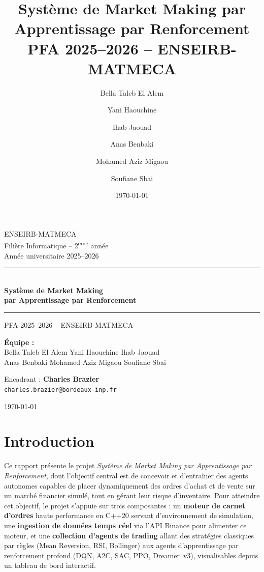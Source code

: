 \documentclass[11pt,a4paper]{article}
\title{
    \vspace{-1cm}
    \Huge \textbf{Système de Market Making par Apprentissage par Renforcement} \\[0.5cm]
    \large PFA 2025--2026 -- ENSEIRB-MATMECA
}
\author{
    Bella Taleb El Alem \and
    Yani Haouchine \and
    Ihab Jaouad \and
    Anas Benbaki \and
    Mohamed Aziz Migaou \and
    Soufiane Sbai
}
\date{\today}
\begin{document}

\begin{titlingpage}
    \begin{center}
        \vspace*{1cm}
        {\large ENSEIRB-MATMECA} \\[0.2cm]
        {\large Filière Informatique -- 2\textsuperscript{ème} année} \\[0.2cm]
        {\large Année universitaire 2025--2026}

        \vspace{2cm}
        \rule{\textwidth}{0.5pt} \\[0.4cm]
        {\Huge \textbf{Système de Market Making}} \\[0.3cm]
        {\Huge \textbf{par Apprentissage par Renforcement}} \\[0.4cm]
        \rule{\textwidth}{0.5pt}

        \vspace{1cm}
        {\large PFA 2025--2026 -- ENSEIRB-MATMECA}

        \vfill

        {\large \textbf{Équipe :}} \\[0.4cm]
        {\large
            Bella Taleb El Alem \quad Yani Haouchine \quad Ihab Jaouad \\[0.2cm]
            Anas Benbaki \quad Mohamed Aziz Migaou \quad Soufiane Sbai
        }

        \vspace{1.5cm}
        {\large Encadrant : \textbf{Charles Brazier}} \\[0.1cm]
        {\normalsize \texttt{charles.brazier@bordeaux-inp.fr}}

        \vspace{1cm}
        {\large \today}
    \end{center}
\end{titlingpage}

\tableofcontents
\newpage

\section{Introduction}

Ce rapport présente le projet \textit{Système de Market Making par
Apprentissage par Renforcement}, dont l'objectif central est de
concevoir et d'entraîner des agents autonomes capables de placer
dynamiquement des ordres d'achat et de vente sur un marché
financier simulé, tout en gérant leur risque d'inventaire. Pour
atteindre cet objectif, le projet s'appuie sur trois composantes :
un \textbf{moteur de carnet d'ordres} haute performance en C++20
servant d'environnement de simulation, une \textbf{ingestion de
données temps réel} via l'API Binance pour alimenter ce moteur,
et une \textbf{collection d'agents de trading} allant des
stratégies classiques par règles (Mean Reversion, RSI, Bollinger)
aux agents d'apprentissage par renforcement profond (DQN, A2C, SAC, PPO, Dreamer~v3), visualisables depuis un tableau de bord interactif.
\end{document}
